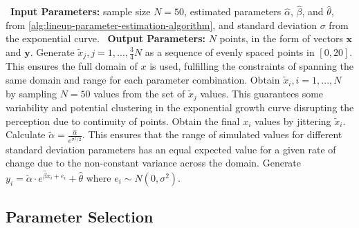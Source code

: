 \documentclass[12pt]{article}
\begin{document}
\begin{algorithm}
  \caption{Lineup Exponential Data Simulation}\label{alg:lineup-exponential-data-simulation-algorithm}
  \begin{algorithmic}[1]
    \Statex \hspace*{-1em}\textbullet~\textbf{Input Parameters:} sample size $N = 50$, estimated parameters $\hat\alpha$, $\hat\beta$, and $\hat\theta$, from \cref{alg:lineup-parameter-estimation-algorithm}, and standard deviation $\sigma$ from the exponential curve.
    \Statex \hspace*{-1em}\textbullet~\textbf{Output Parameters:} $N$ points, in the form of vectors $\mathbf{x}$ and $\mathbf{y}$.
    \State Generate $\tilde x_j, j = 1,..., \frac{3}{4}N$ as a sequence of evenly spaced points in $[0,20]$. This ensures the full domain of $x$ is used, fulfilling the constraints of spanning the same domain and range for each parameter combination.
    \State Obtain $\tilde x_i, i = 1,...,N$ by sampling $N = 50$ values from the set of $\tilde x_j$ values. This guarantees some variability and potential clustering in the exponential growth curve disrupting the perception due to continuity of points.
    \State Obtain the final $x_i$ values by jittering $\tilde x_i$.
    \State Calculate $\tilde\alpha = \frac{\hat\alpha}{e^{\sigma^2/2}}.$ This ensures that the range of simulated values for different standard deviation parameters has an equal expected value for a given rate of change due to the non-constant variance across the domain.
    \State Generate $y_i = \tilde\alpha\cdot e^{\hat\beta x_i + e_i}+\hat\theta$ where $e_i\sim N(0,\sigma^2).$
  \end{algorithmic}
\end{algorithm}

\subsection{Parameter Selection}\label{lineups-parameter-selection}
\end{document}
